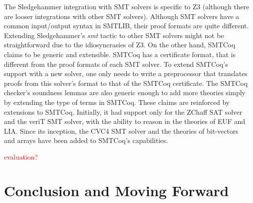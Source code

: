 \documentclass{article}
\begin{document}
	The Sledgehammer integration with SMT solvers is 
	specific to Z3 (although there are looser integrations 
	with other SMT solvers). Although SMT solvers have 
	a common input/output syntax in SMTLIB, their 
	proof formats are quite different. Extending 
	Sledgehammer's \textit{smt} tactic to other 
	SMT solvers might not be straightforward due to 
	the idiosyncrasies of Z3. On the other hand, SMTCoq
	claims to be generic and extensible. SMTCoq has a 
	certificate format, that is different from the proof 
	formats of each SMT solver. To extend SMTCoq's 
	support with a new solver, one only needs to 
	write a preprocessor that translates proofs from 
	this solver's format to that of the SMTCoq certificate.
	The SMTCoq checker's soundness lemmas are also generic 
	enough to add more theories simply by extending 
	the type of terms in SMTCoq. These claims are reinforced
	by extensions to SMTCoq. Initially, it had support only 
	for the ZChaff SAT solver and the veriT SMT solver, 
	with the ability to reason in the theories of EUF and 
	LIA. Since its inception, the CVC4 SMT solver and 
	the theories of bit-vectors and arrays have been 
	added to SMTCoq's capabilities.
	
	\textcolor{red}{evaluation?}
	
\section{Conclusion and Moving Forward}
\label{sec:conc}



\end{document}
